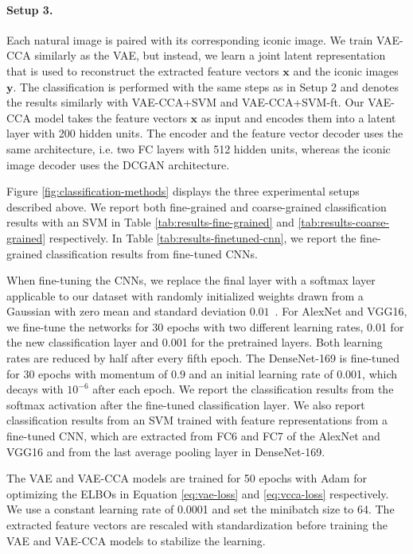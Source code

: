 \paragraph*{Setup 3.} Each natural image is paired with its corresponding iconic image. We train VAE-CCA similarly as the VAE, but instead, we learn a joint latent representation that is used to reconstruct the extracted feature vectors $\mathbf{x}$ and the iconic images $\mathbf{y}$. The classification is performed with the same steps as in Setup 2 and denotes the results similarly with VAE-CCA+SVM and VAE-CCA+SVM-ft. Our VAE-CCA model takes the feature vectors $\mathbf{x}$ as input and encodes them into a latent layer with 200 hidden units. The encoder and the feature vector decoder uses the same architecture, i.e. two FC layers with 512 hidden units, whereas the iconic image decoder uses the DCGAN \cite{radford2015unsupervised} architecture.

Figure \ref{fig:classification-methods} displays the three experimental setups described above. We report both fine-grained and coarse-grained classification results with an SVM in Table \ref{tab:results-fine-grained} and \ref{tab:results-coarse-grained} respectively. In Table \ref{tab:results-finetuned-cnn}, we report the fine-grained classification results from fine-tuned CNNs.

When fine-tuning the CNNs,
we replace the final layer with a softmax layer applicable to our dataset with randomly initialized weights drawn from a Gaussian with zero mean and standard deviation $0.01$~\cite{Zhang2014PartbasedRCNN}. 
For AlexNet and VGG16, we fine-tune the networks for 30 epochs with two different learning rates, 0.01 for the new classification layer and 0.001 for the pretrained layers. Both learning rates are reduced by half after every fifth epoch. The DenseNet-169 is fine-tuned for 30 epochs with momentum of $0.9$ and an initial learning rate of 0.001, which decays with $10^{-6}$ after each epoch. We report the classification results from the softmax activation after the fine-tuned classification layer. 
We also report classification results from an SVM trained with feature representations from a fine-tuned CNN, which are extracted from FC6 and FC7 of the AlexNet and VGG16 and from the last average pooling layer in DenseNet-169.

The VAE and VAE-CCA models are trained for 50 epochs with Adam \cite{kingma2015adam} for optimizing the ELBOs in Equation \ref{eq:vae-loss} and \ref{eq:vcca-loss} respectively. We use a constant learning rate of 0.0001 and set the minibatch size to 64. The extracted feature vectors are rescaled with standardization before training the VAE and VAE-CCA models to stabilize the learning.

